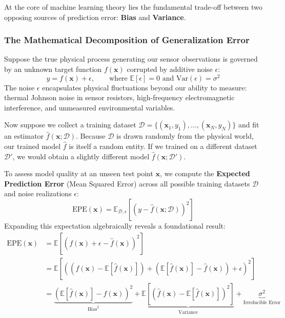 At the core of machine learning theory lies the fundamental trade-off between two opposing sources of prediction error: \textbf{Bias} and \textbf{Variance}.

\subsubsection{The Mathematical Decomposition of Generalization Error}

Suppose the true physical process generating our sensor observations is governed by an unknown target function $f(\mathbf{x})$ corrupted by additive noise $\epsilon$:
\begin{equation}
y = f(\mathbf{x}) + \epsilon, \qquad \text{where } \mathbb{E}[\epsilon] = 0 \text{ and } \text{Var}(\epsilon) = \sigma^2\label{eq:data_generating_process}
\end{equation}
The noise $\epsilon$ encapsulates physical fluctuations beyond our ability to measure: thermal Johnson noise in sensor resistors, high-frequency electromagnetic interference, and unmeasured environmental variables.

Now suppose we collect a training dataset $\mathcal{D} = \{(\mathbf{x}_1, y_1), \dots, (\mathbf{x}_N, y_N)\}$ and fit an estimator $\hat{f}(\mathbf{x}; \mathcal{D})$. Because $\mathcal{D}$ is drawn randomly from the physical world, our trained model $\hat{f}$ is itself a random entity. If we trained on a different dataset $\mathcal{D}'$, we would obtain a slightly different model $\hat{f}(\mathbf{x}; \mathcal{D}')$.

To assess model quality at an unseen test point $\mathbf{x}$, we compute the \textbf{Expected Prediction Error} (Mean Squared Error) across all possible training datasets $\mathcal{D}$ and noise realizations $\epsilon$:
\begin{equation}
\text{EPE}(\mathbf{x}) = \mathbb{E}_{\mathcal{D}, \epsilon}\left[ \left(y - \hat{f}(\mathbf{x}; \mathcal{D})\right)^2 \right]\label{eq:epe_definition}
\end{equation}
Expanding this expectation algebraically reveals a foundational result:
\begin{align}
\text{EPE}(\mathbf{x}) &= \mathbb{E}\left[ \left(f(\mathbf{x}) + \epsilon - \hat{f}(\mathbf{x})\right)^2 \right] \nonumber \\
&= \mathbb{E}\left[ \left( (f(\mathbf{x}) - \mathbb{E}[\hat{f}(\mathbf{x})]) + (\mathbb{E}[\hat{f}(\mathbf{x})] - \hat{f}(\mathbf{x})) + \epsilon \right)^2 \right] \nonumber \\
&= \underbrace{\left( \mathbb{E}[\hat{f}(\mathbf{x})] - f(\mathbf{x}) \right)^2}_{\text{Bias}^2} + \underbrace{\mathbb{E}\left[ \left( \hat{f}(\mathbf{x}) - \mathbb{E}[\hat{f}(\mathbf{x})] \right)^2 \right]}_{\text{Variance}} + \underbrace{\sigma^2}_{\text{Irreducible Error}}\label{eq:bias_variance_decomposition}
\end{align}

